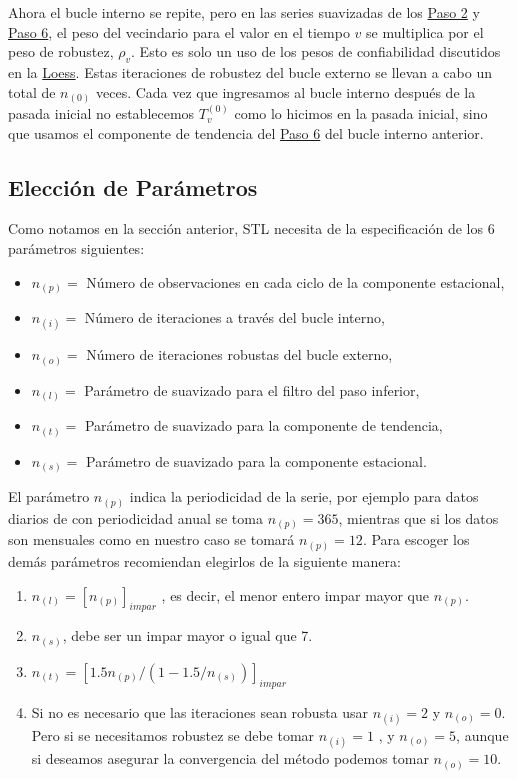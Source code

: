 \documentclass[12pt,oneside]{book}\usepackage[]{graphicx}\usepackage[]{color}
\theoremstyle{definition} %
\begin{document}
Ahora el bucle interno se repite, pero en las series suavizadas de los \hyperref[sbsec:paso2]{Paso 2} y \hyperref[sbsec:paso6]{Paso 6}, el peso del vecindario para el valor en el tiempo $v$ se multiplica por el peso de robustez, $\rho_v$. Esto es solo un uso de los pesos de confiabilidad discutidos en la \hyperref[sec:loess]{Loess}. Estas iteraciones de robustez del bucle externo se llevan a cabo un total de $n_{(0)}$ veces. Cada vez que ingresamos al bucle interno después de la pasada inicial no establecemos $T_v^{(0)}$ como lo hicimos en la pasada inicial, sino que usamos el componente de tendencia del \hyperref[sbsec:paso6]{Paso 6} del bucle interno anterior.

\subsection{Elección de Parámetros}

Como notamos en la sección anterior, STL necesita de la especificación de los 6 parámetros siguientes:
\begin{itemize}
\item $n_{(p)}=$ Número de observaciones en cada ciclo de la componente estacional,
\item $n_{(i)}=$ Número de iteraciones a través del bucle interno,
\item $n_{(o)}=$ Número de iteraciones robustas del bucle externo,
\item $n_{(l)}=$ Parámetro de suavizado para el filtro del paso inferior,
\item $n_{(t)}=$ Parámetro de suavizado para la componente de tendencia,
\item $n_{(s)}=$ Parámetro de suavizado para la componente estacional.
\end{itemize}



El parámetro $n_{(p)}$ indica la periodicidad de la serie, por ejemplo para datos diarios de con periodicidad anual se toma $n_{(p)}=365$, mientras que si los datos son mensuales como en nuestro caso se tomará $n_{(p)}=12$.
Para escoger los demás parámetros \citeauthor{cleveland1990stl} \citeyear{cleveland1990stl} recomiendan elegirlos de la siguiente manera:

\begin{enumerate}
\item $n_{(l)}= [n_{(p)}]_{impar}$ , es decir, el menor entero impar mayor que $n_{(p)}$.
\item $n_{(s)}$, debe ser un impar mayor o igual que 7.
\item $n_{(t)} = [ 1.5n_{(p)}/(1-1.5/n_{(s)})]_{impar}$
\item Si no es necesario que las iteraciones sean robusta usar $n_{(i)}=2$ y $n_{(o)}=0$. Pero si se necesitamos robustez se debe tomar $n_{(i)}=1$ , y $n_{(o)}=5$, aunque si deseamos asegurar la convergencia del método podemos tomar $n_{(o)}=10$.
\end{enumerate}
\end{document}
